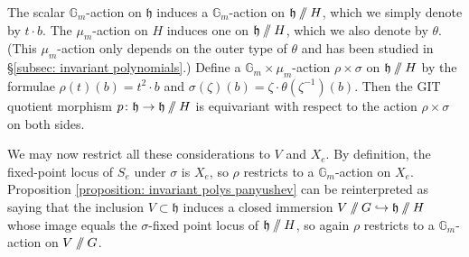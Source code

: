 \documentclass{article} %
\numberwithin{equation}{section}
\theoremstyle{definition}
\newcommand{\G}{\mathbb{G}}
\newcommand{\GIT}{\mathbin{/\mkern-6mu/}}
\newcommand{\frakh}{\mathfrak h}
\begin{document}
The scalar $\G_m$-action on $\frakh$ induces a $\G_m$-action on $\frakh\GIT H$, which we simply denote by $t\cdot b$.
The $\mu_m$-action on $H$ induces one on $\frakh \GIT H$, which we also denote by $\theta$. (This $\mu_m$-action only depends on the outer type of $\theta$ and has been studied in \S\ref{subsec: invariant polynomials}.)
Define a $\G_m\times \mu_m$-action $\rho\times \sigma$ on $\frakh \GIT H$ by the formulae $\rho(t)(b) = t^2 \cdot b$ and $\sigma(\zeta)(b) = \zeta \cdot \theta(\zeta^{-1})(b)$.
Then the GIT quotient morphism $p\colon \frakh \rightarrow \frakh \GIT H$ is equivariant with respect to the action $\rho \times \sigma$ on both sides.


We may now restrict all these considerations to $V$ and $X_e$.
By definition, the fixed-point locus of $S_e$ under $\sigma$ is $X_e$, so $\rho$ restricts to a $\G_m$-action on $X_e$.
Proposition \ref{proposition: invariant polys panyushev} can be reinterpreted as saying that the inclusion $V\subset \frakh$ induces a closed immersion $V\GIT G\hookrightarrow \frakh \GIT H$ whose image equals the $\sigma$-fixed point locus of $\frakh \GIT H$, so again $\rho$ restricts to a $\G_m$-action on $V\GIT G$.
\end{document}
